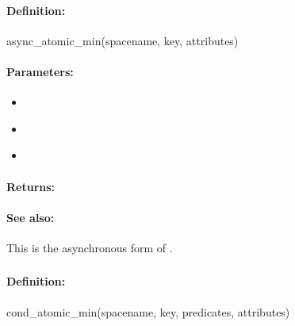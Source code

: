 \paragraph{Definition:}
\begin{rubycode}
async_atomic_min(spacename, key, attributes)
\end{rubycode}

\paragraph{Parameters:}
\begin{itemize}[noitemsep]
\item {}\\

\item {}\\

\item {}\\

\end{itemize}

\paragraph{Returns:}


\paragraph{See also:}  This is the asynchronous form of .

\pagebreak
\subsubsection{}
\label{api:ruby:cond_atomic_min}


\paragraph{Definition:}
\begin{rubycode}
cond_atomic_min(spacename, key, predicates, attributes)
\end{rubycode}

